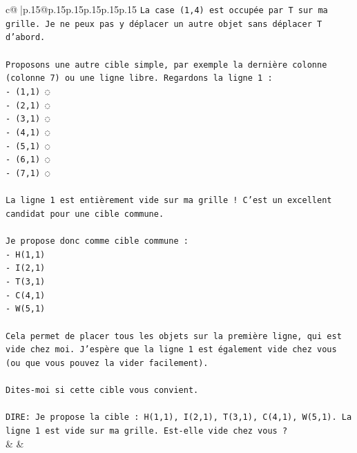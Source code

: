 \documentclass{article}
\begin{document}
{\begin{supertabular}{c@{$\;$}|p{.15\linewidth}@{}p{.15\linewidth}p{.15\linewidth}p{.15\linewidth}p{.15\linewidth}p{.15\linewidth}}
{{{\texttt{La case (1,4) est occupée par T sur ma grille. Je ne peux pas y déplacer un autre objet sans déplacer T d'abord.} \\
\\ 
\texttt{Proposons une autre cible simple, par exemple la dernière colonne (colonne 7) ou une ligne libre. Regardons la ligne 1 :} \\
\texttt{{-} (1,1) ◌} \\
\texttt{{-} (2,1) ◌} \\
\texttt{{-} (3,1) ◌} \\
\texttt{{-} (4,1) ◌} \\
\texttt{{-} (5,1) ◌} \\
\texttt{{-} (6,1) ◌} \\
\texttt{{-} (7,1) ◌} \\
\\ 
\texttt{La ligne 1 est entièrement vide sur ma grille ! C'est un excellent candidat pour une cible commune.} \\
\\ 
\texttt{Je propose donc comme cible commune :} \\
\texttt{{-} H(1,1)} \\
\texttt{{-} I(2,1)} \\
\texttt{{-} T(3,1)} \\
\texttt{{-} C(4,1)} \\
\texttt{{-} W(5,1)} \\
\\ 
\texttt{Cela permet de placer tous les objets sur la première ligne, qui est vide chez moi. J'espère que la ligne 1 est également vide chez vous (ou que vous pouvez la vider facilement).} \\
\\ 
\texttt{Dites{-}moi si cette cible vous convient.} \\
\\ 
\texttt{DIRE: Je propose la cible : H(1,1), I(2,1), T(3,1), C(4,1), W(5,1). La ligne 1 est vide sur ma grille. Est{-}elle vide chez vous ?} \\
            }
        }
    }
    & & \\ \\


\end{supertabular}}
\end{document}
